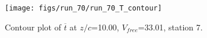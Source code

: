 \begin{figure}[H]
\centering
\texttt{[image: figs/run\_70/run\_70\_T\_contour]}
\caption{Contour plot of $\overline{t}$ at $z/c$=10.00, $V_{free}$=33.01, station 7.}
\label{fig:run_70_T_contour}
\end{figure}


